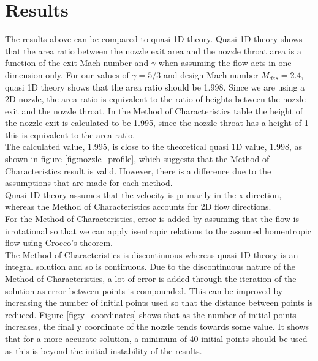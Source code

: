 \documentclass[10pt,a4paper]{article}
\begin{document}
\section{Results}
The results above can be compared to quasi 1D theory. Quasi 1D theory shows that the area ratio between the nozzle exit area and the nozzle throat area is a function of the exit Mach number and $\gamma$ when assuming the flow acts in one dimension only. For our values of $\gamma = 5/3$ and design Mach number $M_{des}=2.4$, quasi 1D theory shows that the area ratio should be 1.998. Since we are using a 2D nozzle, the area ratio is equivalent to the ratio of heights between the nozzle exit and the nozzle throat. In the Method of Characteristics table the height of the nozzle exit is calculated to be 1.995, since the nozzle throat has a height of 1 this is equivalent to the area ratio.
\\The calculated value, 1.995, is close to the theoretical quasi 1D value, 1.998, as shown in figure \ref{fig:nozzle_profile}, which suggests that the Method of Characteristics result is valid. However, there is a difference due to the assumptions that are made for each method.
\\Quasi 1D theory assumes that the velocity is primarily in the x direction, whereas the Method of Characteristics accounts for 2D flow directions. 
\\For the Method of Characteristics, error is added by assuming that the flow is irrotational so that we can apply isentropic relations to the assumed homentropic flow using Crocco's theorem.
\\The Method of Characteristics is discontinuous whereas quasi 1D theory is an integral solution and so is continuous. Due to the discontinuous nature of the Method of Characteristics, a lot of error is added through the iteration of the solution as error between points is compounded. This can be improved by increasing the number of initial points used so that the distance between points is reduced. Figure \ref{fig:y_coordinates} shows that as the number of initial points increases, the final y coordinate of the nozzle tends towards some value. It shows that for a more accurate solution, a minimum of 40 initial points should be used as this is beyond the initial instability of the results.
\end{document}
